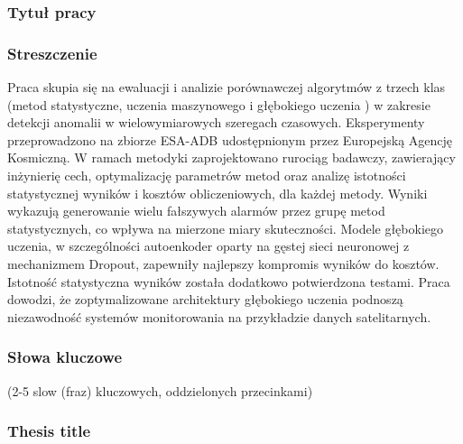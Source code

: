 \documentclass[a4paper,twoside,12pt]{book}
\begin{document}
	
	
	\cleardoublepage
	
	\rmfamily\normalfont
	\pagestyle{empty}
	
	
	
	\subsubsection*{Tytuł pracy} 
	\Title
	
	\subsubsection*{Streszcz\label{key}enie}  
	Praca skupia się na ewaluacji i analizie porównawczej algorytmów z trzech klas (metod statystyczne, uczenia maszynowego i głębokiego uczenia ) w zakresie detekcji anomalii w wielowymiarowych szeregach czasowych. Eksperymenty przeprowadzono na zbiorze ESA-ADB udostępnionym przez Europejską Agencję Kosmiczną. W ramach metodyki zaprojektowano rurociąg badawczy, zawierający inżynierię cech, optymalizację parametrów metod oraz analizę istotności statystycznej wyników i kosztów obliczeniowych, dla każdej metody. Wyniki wykazują generowanie wielu fałszywych alarmów przez grupę metod statystycznych, co wpływa na mierzone miary skuteczności. Modele głębokiego uczenia, w szczególności autoenkoder oparty na gęstej sieci neuronowej z mechanizmem Dropout, zapewniły najlepszy kompromis wyników do kosztów. Istotność statystyczna wyników została dodatkowo potwierdzona testami. Praca dowodzi, że zoptymalizowane architektury głębokiego uczenia podnoszą niezawodność systemów monitorowania na przykładzie danych satelitarnych.  
	
	\subsubsection*{Słowa kluczowe} 
	(2-5 slow (fraz) kluczowych, oddzielonych przecinkami)
	
	\subsubsection*{Thesis title} 
	\begin{otherlanguage}{british}
		\TitleAlt
	\end{otherlanguage}
	
\end{document}
